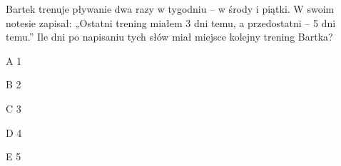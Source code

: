 \begin{tresc}
Bartek trenuje pływanie dwa razy w tygodniu – w środy i piątki. W swoim notesie zapisał: „Ostatni trening miałem 3 dni temu, a przedostatni – 5 dni temu.” Ile dni po napisaniu tych słów miał miejsce kolejny trening Bartka?
\end{tresc}
\begin{wariant}{A} 1 \end{wariant}
\begin{wariant}{B} 2 \end{wariant}
\begin{wariant}{C} 3 \end{wariant}
\begin{wariant}{D} 4 \end{wariant}
\begin{wariant}{E} 5 \end{wariant}
